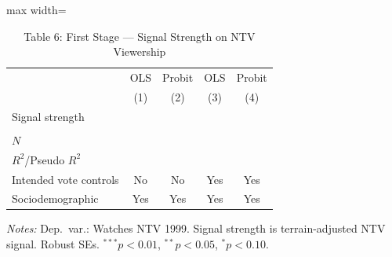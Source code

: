 \begin{table}[htbp]
\centering
\caption{Table 6: First Stage --- Signal Strength on NTV Viewership}
\label{tab:enik_table6}
\begin{adjustbox}{max width=\textwidth}
\begin{tabular}{lcccc}
\toprule
 & OLS & Probit & OLS & Probit \\
 & (1) & (2) & (3) & (4) \\
\midrule
Signal strength &  &  &  &  \\
 &  &  &  &  \\
$N$ &  &  &  &  \\
$R^2$/Pseudo $R^2$ &  &  &  &  \\
\midrule
Intended vote controls & No & No & Yes & Yes \\
Sociodemographic & Yes & Yes & Yes & Yes \\
\bottomrule
\end{tabular}
\end{adjustbox}
\parbox{\textwidth}{\footnotesize\textit{Notes:} Dep.\ var.: Watches NTV 1999. Signal strength is terrain-adjusted NTV signal. Robust SEs. $^{***}p<0.01$, $^{**}p<0.05$, $^{*}p<0.10$.}
\end{table}